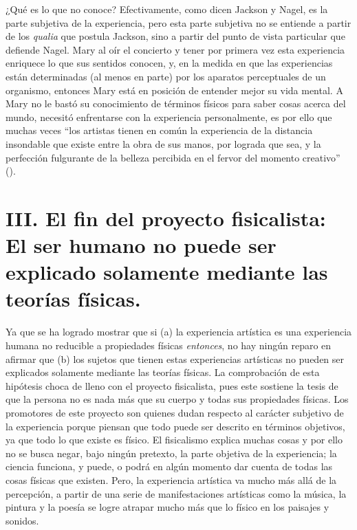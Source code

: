 \documentclass[]{book}
\begin{document}
\begin{refsection}
¿Qué es lo que no conoce? Efectivamente, como dicen Jackson y Nagel, es
la parte subjetiva de la experiencia, pero esta parte subjetiva no se
entiende a partir de los \emph{qualia} que postula Jackson, sino a
partir del punto de vista particular que defiende Nagel. Mary al oír el
concierto y tener por primera vez esta experiencia enriquece lo que sus
sentidos conocen, y, en la medida en que las experiencias están
determinadas (al menos en parte) por los aparatos perceptuales de un
organismo, entonces Mary está en posición de entender mejor su vida
mental. A Mary no le bastó su conocimiento de términos físicos para
saber cosas acerca del mundo, necesitó enfrentarse con la experiencia
personalmente, es por ello que muchas veces ``los artistas tienen en
común la experiencia de la distancia insondable que existe entre la obra
de sus manos, por lograda que sea, y la perfección fulgurante de la
belleza percibida en el fervor del momento creativo'' (\cite{Juan1999}).

\section*{III. El fin del proyecto
  fisicalista: El ser humano no puede ser explicado solamente mediante
  las teorías físicas.}


Ya que se ha logrado mostrar que si (a) la experiencia artística es una
experiencia humana no reducible a propiedades físicas \emph{entonces},
no hay ningún reparo en afirmar que (b) los sujetos que tienen estas
experiencias artísticas no pueden ser explicados solamente mediante las
teorías físicas. La comprobación de esta hipótesis choca de lleno con el
proyecto fisicalista, pues este sostiene la tesis de que la persona no
es nada más que su cuerpo y todas sus propiedades físicas. Los
promotores de este proyecto son quienes dudan respecto al carácter
subjetivo de la experiencia porque piensan que todo puede ser descrito
en términos objetivos, ya que todo lo que existe es físico. El
fisicalismo explica muchas cosas y por ello no se busca negar, bajo
ningún pretexto, la parte objetiva de la experiencia; la ciencia
funciona, y puede, o podrá en algún momento dar cuenta de todas las
cosas físicas que existen. Pero, la experiencia artística va mucho más
allá de la percepción, a partir de una serie de manifestaciones
artísticas como la música, la pintura y la poesía se logre atrapar mucho
más que lo físico en los paisajes y sonidos.


\end{refsection}
\end{document}
